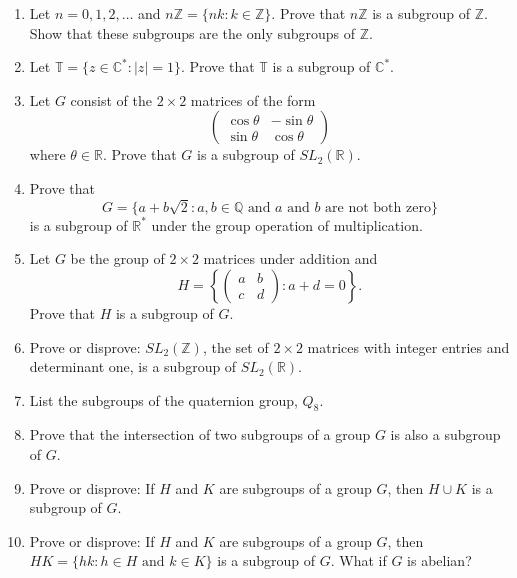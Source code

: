 \documentclass[12pt,reqno]{amsart}
\begin{document}
\begin{enumerate}[{\bf 1.}]
 
\item
Let $n = 0, 1, 2, \ldots$ and $n {\mathbb Z} = \{ nk : k \in  {\mathbb Z}
\}$. Prove that $n {\mathbb Z}$ is a subgroup of ${\mathbb Z}$.  Show that
these subgroups are the only subgroups of $\mathbb{Z}$.
 
 
\item
Let ${\mathbb T} = \{ z \in  {\mathbb C}^* : |z| =1 \}$. Prove that ${\mathbb
T}$ is a subgroup of ${\mathbb C}^*$. 
 
 
\item
Let $G$ consist of the $2 \times 2$ matrices of the form
\[
\begin{pmatrix}
\cos \theta & -\sin \theta \\
\sin \theta & \cos \theta
\end{pmatrix}
\]
where $\theta \in {\mathbb R}$. Prove that $G$ is a subgroup of $SL_2(
{\mathbb R})$. 
 
 
\item
Prove that
\[
G =
\{ a + b \sqrt{2} : \mbox{$a, b \in {\mathbb
Q}$ and $a$ and $b$ are not both zero}  \}
\]
is a subgroup of ${\mathbb R}^{\ast}$ under the group operation of
multiplication. 
 
 
\item
Let $G$ be the group of $2 \times 2$ matrices under addition and
\[
H
=
\left\{
\begin{pmatrix}
a & b \\
c & d
\end{pmatrix}
:
a + d = 0
\right\}.
\]
Prove that $H$ is a subgroup of $G$.
 
 
\item
Prove or disprove: $SL_2( {\mathbb Z} )$, the set of $2 \times 2$
matrices with integer entries and determinant one, is a subgroup of
$SL_2( {\mathbb R} )$. 
 
 
\item
List the subgroups of the quaternion group, $Q_8$.
 
 
\item
Prove that the intersection of two subgroups of a group $G$ is also a
subgroup of $G$. 
 
 
\item
Prove or disprove:  If $H$ and $K$ are subgroups of a group $G$, then
$H \cup K$ is a subgroup of $G$. 
 
 
\item
Prove or disprove: If $H$ and $K$ are subgroups of a group $G$, then
$H K = \{hk : h \in H \text{ and } k \in K \}$ is a subgroup of $G$.
What if $G$ is abelian? 
 

\end{enumerate}
\end{document}
